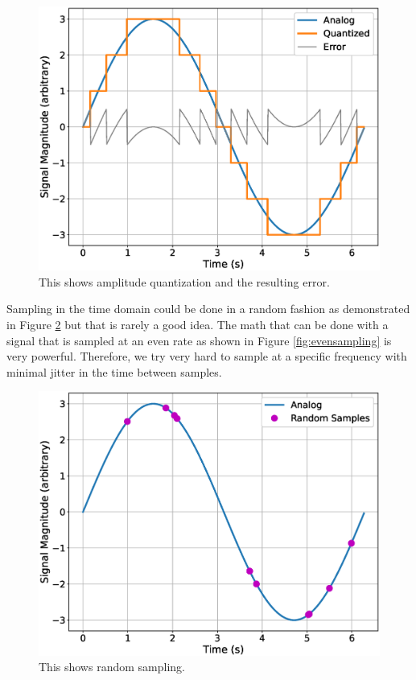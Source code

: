 \begin{figure}[!htb]
	\centering
	\includegraphics[scale=0.5]{dataCollection/quantizedError.eps}
	\caption{This shows amplitude quantization and the resulting error.}
	\label{fig:quantizederror}
\end{figure}

Sampling in the time domain could be done in a random fashion as demonstrated in Figure \ref{fig:randsample}
but that is rarely a good idea. The math that can be done with a signal that is sampled at an even rate 
as shown in Figure \ref{fig:evensampling} is very powerful. Therefore, we try very hard to sample at 
a specific frequency with minimal jitter in the time between samples.

\begin{figure}[!htb]
	\centering
	\includegraphics[scale=0.5]{dataCollection/randomSampling.eps}
	\caption{This shows random sampling.}
	\label{fig:randsample}
\end{figure}

